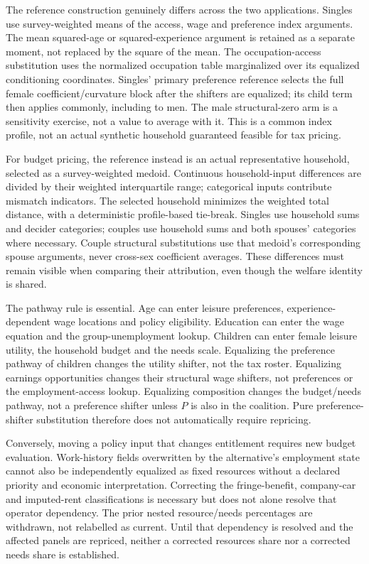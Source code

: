 \documentclass[11pt,a4paper]{article}
\begin{document}
The reference construction genuinely differs across the two applications. Singles use survey-weighted means of the access, wage and preference index arguments. The mean squared-age or squared-experience argument is retained as a separate moment, not replaced by the square of the mean. The occupation-access substitution uses the normalized occupation table marginalized over its equalized conditioning coordinates. Singles' primary preference reference selects the full female coefficient/curvature block after the shifters are equalized; its child term then applies commonly, including to men. The male structural-zero arm is a sensitivity exercise, not a value to average with it. This is a common index profile, not an actual synthetic household guaranteed feasible for tax pricing.

For budget pricing, the reference instead is an actual representative household, selected as a survey-weighted medoid. Continuous household-input differences are divided by their weighted interquartile range; categorical inputs contribute mismatch indicators. The selected household minimizes the weighted total distance, with a deterministic profile-based tie-break. Singles use household sums and decider categories; couples use household sums and both spouses' categories where necessary. Couple structural substitutions use that medoid's corresponding spouse arguments, never cross-sex coefficient averages. These differences must remain visible when comparing their attribution, even though the welfare identity is shared.

The pathway rule is essential. Age can enter leisure preferences, experience-dependent wage locations and policy eligibility. Education can enter the wage equation and the group-unemployment lookup. Children can enter female leisure utility, the household budget and the needs scale. Equalizing the preference pathway of children changes the utility shifter, not the tax roster. Equalizing earnings opportunities changes their structural wage shifters, not preferences or the employment-access lookup. Equalizing composition changes the budget/needs pathway, not a preference shifter unless \(P\) is also in the coalition. Pure preference-shifter substitution therefore does not automatically require repricing.

Conversely, moving a policy input that changes entitlement requires new budget evaluation. Work-history fields overwritten by the alternative's employment state cannot also be independently equalized as fixed resources without a declared priority and economic interpretation. Correcting the fringe-benefit, company-car and imputed-rent classifications is necessary but does not alone resolve that operator dependency. The prior nested resource/needs percentages are withdrawn, not relabelled as current. Until that dependency is resolved and the affected panels are repriced, neither a corrected resources share nor a corrected needs share is established.
\end{document}
